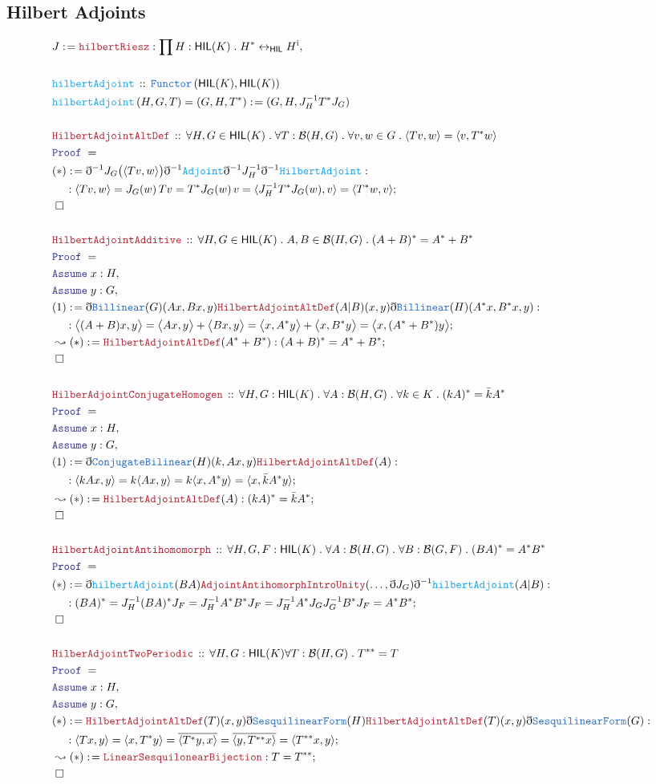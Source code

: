 \documentclass[12pt]{scrartcl}
\newcommand{\TYPE}[1]{\textcolor{NavyBlue}{\mathtt{#1}}}
\newcommand{\FUNC}[1]{\textcolor{Cerulean}{\mathtt{#1}}}
\newcommand{\LOGIC}[1]{\textcolor{Blue}{\mathtt{#1}}}
\newcommand{\THM}[1]{\textcolor{Maroon}{\mathtt{#1}}}
\renewcommand{\.}{\; . \;}
\newcommand{\de}{: \kern 0.1pc =}
\newcommand{\Act}[1]{\left( #1 \right)}
\newcommand{\Theorem}[2]{& \THM{#1} \, :: \, #2 \\ & \Proof = \\ }
\newcommand{\DeclareFunc}[2]{& \FUNC{#1} \, :: \, #2 \\}
\newcommand{\DefineNamedFunc}[4]{&  \FUNC{#1}\Act{#2} = #3 \de #4 \\}
\newcommand{\NewLine}{\\ & \kern 1pc}
\newcommand{\Page}[1]{\begin{align*} #1 \end{align*} \newpage   }
\newcommand{ \bd }{ \ByDef }
\newcommand{\Func}[2]{\TYPE{Functor}\left( #1, #2 \right)}
\newcommand{\ToBij}{\leftrightarrow}
\newcommand{\Say}[3]{& #1 \de #2 : #3, \\}
\newcommand{\Conclude}[3]{& #1 \de #2 : #3; \\}
\newcommand{\DeriveConclude}[3]{& \leadsto #1 \de #2 : #3 ; \\}
\newcommand{\A}{\LOGIC{Assume} \;}
\newcommand{\Assume}[2]{& \A #1 : #2, \\}
\newcommand{\QED}{\; \square}
\newcommand{\EndProof}{& \QED \\}
\newcommand{\ByDef}{\eth}
\newcommand{\Proof}{\LOGIC{Proof} \; }
\newcommand{\HIL}{\mathsf{HIL}} %
\newcommand{\B}{\mathcal{B}}
\begin{document}
\subsection{Hilbert Adjoints}
\Page{
	\Say{J}{\THM{hilbertRiesz}}{\prod H : \HIL(K) \. H^* \ToBij_\HIL H^\mathrm{i}} 
	\\
	\DeclareFunc{hilbertAdjoint}{\Func{\HIL(K)}{\HIL(K)}}
	\DefineNamedFunc{hilbertAdjoint}{H,G,T}{ (G,H,T^*)}{(G,H,J_H^{-1}T^*J_G)}
	\\
	\Theorem{HilbertAdjointAltDef}{ \forall H,G \in \HIL(K) \. \forall T : \B(H,G) \. \forall v,w \in G \. \langle Tv, w \rangle = \langle v, T^* w \rangle  }
	\Conclude{(*)}{ \bd^{-1} J_G \big(\langle Tv, w  \rangle\big) \bd^{-1} \FUNC{Adjoint} \bd^{-1} J_H^{-1} \bd^{-1} \FUNC{HilbertAdjoint}  }
	{ 
		\NewLine :
		\langle Tv, w \rangle = 
		J_G(w) \, Tv = 
		T^* J_G(w) \, v = 
		\langle J_H^{-1} T^* J_G(w), v \rangle =
		\langle T^*w, v  \rangle   
	}
	\EndProof
	\\
	\Theorem{HilbertAdjointAdditive}{\forall H,G \in \HIL(K) \. A,B \in \B(H,G) \. (A + B)^* = A^* + B^*}
	\Assume{x}{H}
	\Assume{y}{G}
	\Conclude{(1)}{ \bd \TYPE{Billinear}(G)(Ax,Bx,y) \THM{HilbertAdjointAltDef}(A|B)(x,y) \bd \TYPE{Billinear}(H)(A^*x,B^*x,y)  }
	{ 
	\NewLine :
	\big\langle (A + B)x, y \big\rangle = \big\langle Ax, y\big\rangle 
	+  \big\langle Bx, y \big\rangle  = 
	\big\langle x, A^*y \big\rangle + \big\langle x, B^*y \big\rangle  =
	\big\langle x, (A^* + B^*)y \big\rangle 
	}
	\DeriveConclude{(*)}{\THM{HilbertAdjointAltDef}(A^* + B^*)}{ (A + B)^* = A^* + B^* }
	\EndProof
	\\
	\Theorem{HilberAdjointConjugateHomogen}{\forall H,G : \HIL(K) \. \forall A : \B(H,G) \. \forall k \in K \. (kA)^* = \bar k A^*}
	\Assume{x}{H}
	\Assume{y}{G}
	\Conclude{(1)}{ \bd \TYPE{ConjugateBilinear}(H)(k,Ax,y)\THM{HilbertAdjointAltDef}(A)  }
	{
		\NewLine :
		\langle kAx, y \rangle  = k \langle Ax, y \rangle = k \langle x, A^* y \rangle = \langle x, \bar{k}A^* y \rangle
		}
	\DeriveConclude{(*)}{\THM{HilbertAdjointAltDef}(A)}{(kA)^* = \bar{k}A^* }
	\EndProof
	\\
	\Theorem{HilbertAdjointAntihomomorph}{\forall H,G,F : \HIL(K) \. \forall A : \B(H,G) \. \forall B : \B(G,F) \. (BA)^* = A^* B^*}
	\Conclude{(*)}{ \bd \FUNC{hilbertAdjoint}(BA)\THM{AdjointAntihomorph}\THM{IntroUnity}(\ldots,\bd J_G)
	\bd^{-1} \FUNC{hilbertAdjoint}(A|B)
	}
	{ 
	\NewLine :
	(BA)^* =  J_H^{-1}(BA)^*J_F = J_H^{-1} A^*B^* J_F =  J_H^{-1} A^* J_G J_G^{-1} B^* J_F = A^*B^*  }
	\EndProof
	\\
	\Theorem{HilberAdjointTwoPeriodic}{\forall H,G : \HIL(K) \forall T : \B(H,G) \. T^{**} = T }
	\Assume{x}{H}
	\Assume{y}{G}
	\Conclude{(*) }{\THM{HilbertAdjointAltDef}(T)(x,y)\bd \TYPE{SesquilinearForm}(H)
		\THM{HilbertAdjointAltDef}(T)(x,y) \bd \TYPE{SesquilinearForm}(G)}
	{
	 	\NewLine :
	 	\langle Tx, y \rangle =
	 	\langle x, T^*y \rangle = \overline{\langle T^* y, x\rangle} = \overline{\langle y, T^{**} x  \rangle} =
	 	\langle T^{**} x, y \rangle 
	}
	\DeriveConclude{(*)}{\THM{LinearSesquilonearBijection}}{T = T^{**}}
	\EndProof
}
\end{document}
